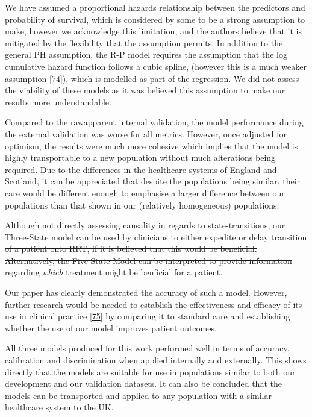 \documentclass[
]{article}
\begin{document}
We have assumed a proportional hazards relationship between the predictors and probability of survival, which is considered by some to be a strong assumption to make, however we acknowledge this limitation, and the authors believe that it is mitigated by the flexibility that the assumption permits. In addition to the general PH assumption, the R-P model requires the assumption that the log cumulative hazard function follows a cubic spline, (however this is a much weaker assumption {[}\protect\hyperlink{ref-royston_flexible_2002}{74}{]}), which is modelled as part of the regression. We did not assess the viability of these models as it was believed this assumption to make our results more understandable.

Compared to the \sout{raw}apparent internal validation, the model performance during the external validation was worse for all metrics. However, once adjusted for optimism, the results were much more cohesive which implies that the model is highly transportable to a new population without much alterations being required. Due to the differences in the healthcare systems of England and Scotland, it can be appreciated that despite the populations being similar, their care would be different enough to emphasise a larger difference between our populations than that shown in our (relatively homogeneous) populations.

\sout{Although not directly assessing causality in regards to state-transitions, our Three-State model can be used by clinicians to either expedite or delay transition of a patient onto RRT, if it is believed that this would be beneficial. Alternatively, the Five-State Model can be interpreted to provide information regarding \emph{which} treatment might be benficial for a patient.}

Our paper has clearly demonstrated the accuracy of such a model. However, further research would be needed to establish the effectiveness and efficacy of its use in clinical practice {[}\protect\hyperlink{ref-moons_prognosis_2009-1}{75}{]} by comparing it to standard care and establishing whether the use of our model improves patient outcomes.

All three models produced for this work performed well in terms of accuracy, calibration and discrimination when applied internally and externally. This shows directly that the models are suitable for use in populations similar to both our development and our validation datasets. It can also be concluded that the models can be transported and applied to any population with a similar healthcare system to the UK.
\end{document}
